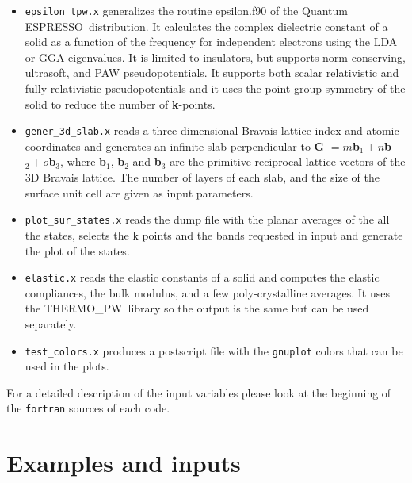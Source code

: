 \documentclass[12pt,a4paper]{article}
\def\qe{{\sc Quantum ESPRESSO}}
\def\tpw{{\sc THERMO\_PW}}
\begin{document}
\begin{itemize}
\item \texttt{epsilon\_tpw.x} generalizes the routine
epsilon.f90 of the \qe\ distribution. It calculates the complex dielectric
constant of a solid as a function of the frequency for independent electrons
using the LDA or GGA eigenvalues. It is limited to insulators, but supports
norm-conserving, ultrasoft, and PAW pseudopotentials. It supports both scalar
relativistic and fully relativistic pseudopotentials and it uses the point
group symmetry of the solid to reduce the number of {\bf k}-points.

\item \texttt{gener\_3d\_slab.x} reads a three dimensional
Bravais lattice index and atomic coordinates and generates an infinite slab
perpendicular to {\bf G} $= m ${\bf b}$_1 + n ${\bf b}$_2 + o ${\bf b}$_3$, 
where {\bf b}$_1$, {\bf b}$_2$ and {\bf b}$_3$ are the primitive reciprocal 
lattice
vectors of the 3D Bravais lattice. The number of layers of each slab, and the
size of the surface unit cell are given as input parameters.

\item \texttt{plot\_sur\_states.x} reads the dump file
with the planar averages of the all the states, selects the k points
and the bands requested in input and generate the plot of the states.

\item \texttt{elastic.x} reads the elastic constants of a
solid and computes the elastic compliances, the bulk modulus, and a few
poly-crystalline averages. It uses the \tpw\ library so the output is the
same but can be used separately. 

\item \texttt{test\_colors.x} produces a postscript file with the 
\texttt{gnuplot} colors that can be used in the plots.   

\end{itemize}

For a detailed description of the input variables please look at the beginning 
of the \texttt{fortran} sources of each code.

\section{\color{coral}Examples and inputs}
\end{document}
